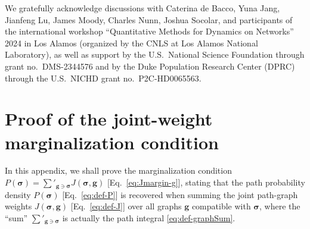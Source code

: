 \documentclass[english,10pt,aps,pra,twocolumn,superscriptaddress,floatfix,fleqn]{revtex4-2}
\renewcommand{\vec}[1]{{\boldsymbol{#1}}}
\newcommand{\vg}{\vec{g}}
\newcommand{\vs}{\vec{\sigma}}
\begin{document}
\begin{acknowledgments}
We gratefully acknowledge discussions with Caterina de Bacco, Yuna Jang, Jianfeng Lu, James Moody, Charles Nunn, Joshua Socolar, and participants of the international workshop ``Quantitative Methods for Dynamics on Networks'' 2024 in Los Alamos (organized by the CNLS at Los Alamos National Laboratory), as well as support by the U.S.\ National Science Foundation through grant no.\ DMS-2344576 and by the Duke Population Research Center (DPRC) through the U.S.\ NICHD grant no.\ P2C-HD0065563.
\end{acknowledgments}


\onecolumngrid
\appendix
\section{Proof of the joint-weight marginalization condition}\label{appx:Jmargin-g}
In this appendix, we shall prove the marginalization condition $P(\vs)= \sum'_{\vg\ni\vs} J(\vs,\vg)$ [Eq.~\eqref{eq:Jmargin-g}], stating that the path probability density $P(\vs)$ [Eq.~\eqref{eq:def-P}] is recovered when summing the joint path-graph weights $J(\vs,\vg)$ [Eq.~\eqref{eq:def-J}] over all graphs $\vg$ compatible with $\vs$, where the ``sum'' $\sum'_{\vg\ni\vs}$ is actually the path integral \eqref{eq:def-graphSum}.
\end{document}
